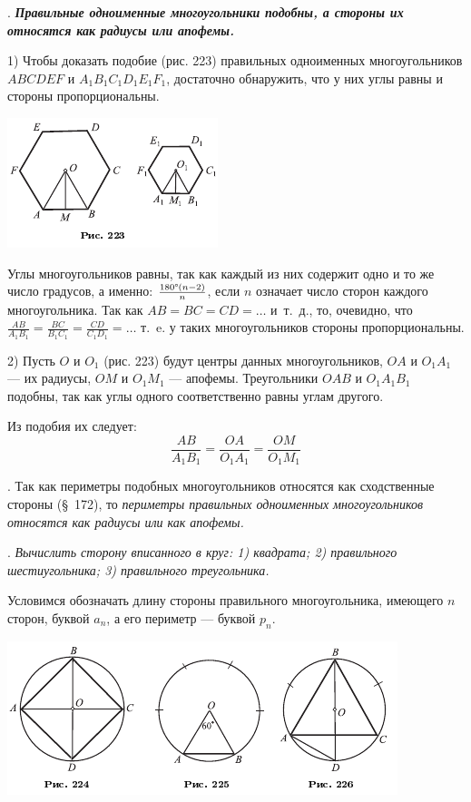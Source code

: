 \documentclass[oneside]{book}
\begin{document}
.
\textbf{\emph{Правильные одноименные многоугольники подобны, а стороны их относятся как радиусы или апофемы.}}

1) Чтобы доказать подобие (рис. 223) правильных одноименных многоугольников $ABCDEF$ и $A_1B_1C_1D_1E_1F_1$, достаточно обнаружить, что у них углы равны и стороны пропорциональны.

\includegraphics{pics/ris-223}

Углы многоугольников равны, так как каждый из них содержит одно и то же число градусов, а именно: $\frac{180\degree(n-2)}{n}$, если $n$ означает число сторон каждого многоугольника.
Так как $AB=BC = CD=\dots$ и~т.~д., то, очевидно, что
$\frac{AB}{A_1B_1}=\frac{BC}{B_1C_1} = \frac{CD}{C_1D_1}=\dots$ т.~e. у таких многоугольников стороны пропорциональны.

2) Пусть $O$ и $O_1$ (рис. 223) будут центры данных многоугольников, $OA$ и $O_1A_1$ — их радиусы, $OM$ и $O_1M_1$ — апофемы.
Треугольники $OAB$ и $O_1A_1B_1$ подобны, так как углы одного соответственно равны углам другого.

Из подобия их следует:
\[\frac{AB}{A_1B_1}=\frac{OA}{O_1A_1} = \frac{OM}{O_1M_1}\]

.
Так как периметры подобных многоугольников относятся как сходственные стороны (§~172), то \emph{периметры правильных одноименных многоугольников относятся как радиусы или как апофемы.}

.
\emph{Вычислить сторону вписанного в круг:
1) квадрата;
2) правильного шестиугольника;
3) правильного треугольника.}

Условимся обозначать длину стороны правильного многоугольника, имеющего $n$ сторон, буквой $a_n$, а его периметр — буквой $p_n$.

\includegraphics{pics/ris-224-226}
\end{document}
